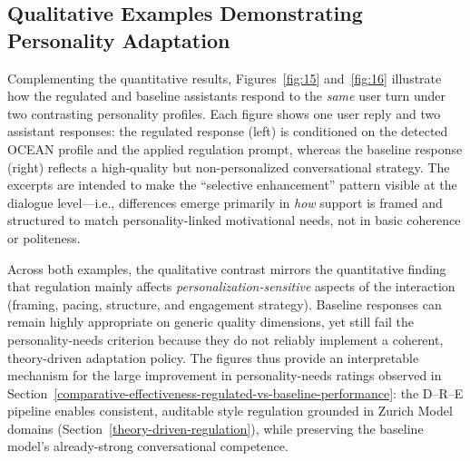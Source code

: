 \subsection{Qualitative Examples Demonstrating Personality Adaptation}\label{qualitative-examples-demonstrating-personality-adaptation}

Complementing the quantitative results, Figures~\ref{fig:15} and~\ref{fig:16} illustrate how the regulated and baseline assistants respond to the \emph{same} user turn under two contrasting personality profiles. Each figure shows one user reply and two assistant responses: the regulated response (left) is conditioned on the detected OCEAN profile and the applied regulation prompt, whereas the baseline response (right) reflects a high-quality but non-personalized conversational strategy. The excerpts are intended to make the ``selective enhancement'' pattern visible at the dialogue level---i.e., differences emerge primarily in \emph{how} support is framed and structured to match personality-linked motivational needs, not in basic coherence or politeness.





Across both examples, the qualitative contrast mirrors the quantitative finding that regulation mainly affects \emph{personalization-sensitive} aspects of the interaction (framing, pacing, structure, and engagement strategy). Baseline responses can remain highly appropriate on generic quality dimensions, yet still fail the personality-needs criterion because they do not reliably implement a coherent, theory-driven adaptation policy. The figures thus provide an interpretable mechanism for the large improvement in personality-needs ratings observed in Section~\ref{comparative-effectiveness-regulated-vs-baseline-performance}: the D--R--E pipeline enables consistent, auditable style regulation grounded in Zurich Model domains (Section~\ref{theory-driven-regulation}), while preserving the baseline model's already-strong conversational competence.


